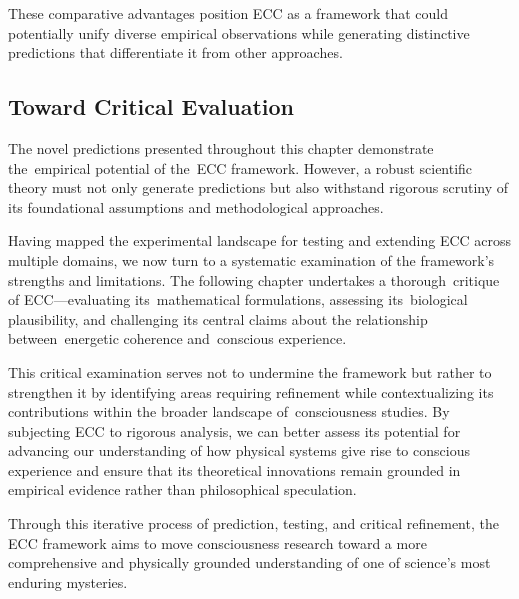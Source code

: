 These comparative advantages position ECC as a framework that could potentially unify diverse empirical observations while generating distinctive predictions that differentiate it from other approaches.

\subsection*{Toward Critical Evaluation}

The novel predictions presented throughout this chapter demonstrate the~empirical potential of the~ECC framework. However, a robust scientific theory must not only generate predictions but also withstand rigorous scrutiny of its foundational assumptions and methodological approaches.

Having mapped the experimental landscape for testing and extending ECC across multiple domains, we now turn to a systematic examination of the framework's strengths and limitations. The following chapter undertakes a thorough~critique of ECC—evaluating its~mathematical formulations, assessing its~biological plausibility, and challenging its central claims about the relationship between~energetic coherence and~conscious experience.

This critical examination serves not to undermine the framework but rather to strengthen it by identifying areas requiring refinement while contextualizing its contributions within the broader landscape of~consciousness studies. By subjecting ECC to rigorous analysis, we can better assess its potential for advancing our understanding of how physical systems give rise to conscious experience and ensure that its theoretical innovations remain grounded in empirical evidence rather than philosophical speculation.

Through this iterative process of prediction, testing, and critical refinement, the ECC framework aims to move consciousness research toward a more comprehensive and physically grounded understanding of one of science's most enduring mysteries.
